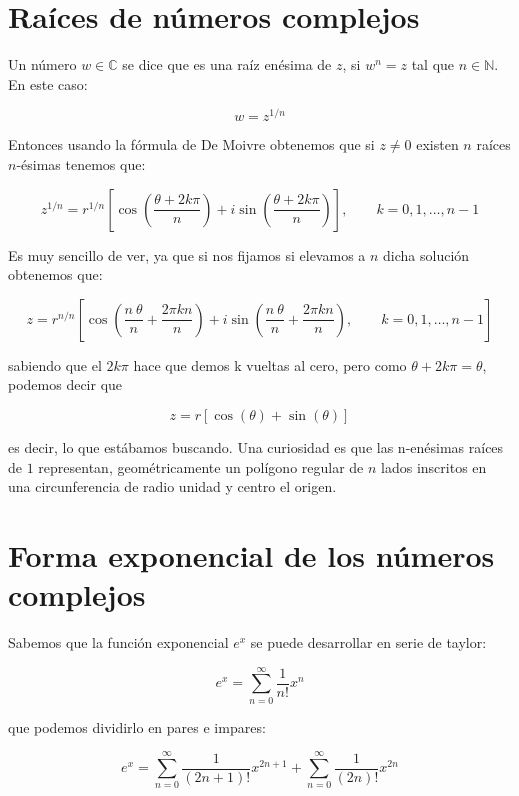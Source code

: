 \documentclass[12pt]{book}
\newcommand{\parentesis}[1]{\left( #1  \right)}
\newcommand{\ccorchetes}[1]{\left[ #1  \right]}
\begin{document}
\section{Raíces de números complejos}

Un número $w \in \mathbb{C}$ se dice que es una raíz enésima de $z$, si $w^n=z$ tal que $n \in \mathbb{N}$. En este caso:

\begin{equation}
w = z^{1/n}
\end{equation}


Entonces usando la fórmula de De Moivre obtenemos que si $z \neq 0$ existen $n$ raíces $n$-ésimas tenemos que:

\begin{equation}
z^{1/n} = r^{1/n} \ccorchetes{\cos \parentesis{\frac{\theta+2k \pi}{n}} + i \sin \parentesis{\frac{\theta + 2k \pi}{n}}}, \quad \quad k=0,1,\ldots,n-1
\end{equation}

Es muy sencillo de ver, ya que si nos fijamos si elevamos a $n$ dicha solución obtenemos que:

$$
z = r^{n/n} \ccorchetes{ \cos \parentesis{\frac{n \ \theta}{n}+ \frac{2 \pi k n}{n}} + i \sin \parentesis{\frac{n \ \theta}{n}+ \frac{2 \pi k n}{n}}, \quad \quad k=0,1,\ldots,n-1}$$

sabiendo que el $2k \pi$ hace que demos k vueltas al cero, pero como $\theta + 2k \pi = \theta$, podemos decir que

$$ z = r \ccorchetes{\cos(\theta) + \sin (\theta)} $$ 

es decir, lo que estábamos buscando. Una curiosidad es que las n-enésimas raíces de $1$ representan, geométricamente un polígono regular de $n$ lados inscritos en una circunferencia de radio unidad y centro el origen. 


\section{Forma exponencial de los números complejos}

Sabemos que la función exponencial $e^x$ se puede desarrollar en serie de taylor: 

\begin{equation}
e^x = \sum_{n=0}^{\infty} \dfrac{1}{n!} x^n 
\end{equation}

que podemos dividirlo en pares e impares:

\begin{equation}
e^x = \sum_{n=0}^{\infty} \dfrac{1}{(2n+1)!} x^{2n+1} + \sum_{n=0}^{\infty} \dfrac{1}{(2n)!} x^{2n} 
\end{equation}
\end{document}
